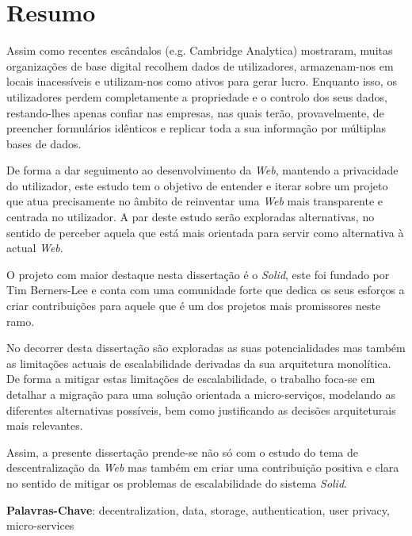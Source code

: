 \chapter*{Resumo}
Assim como recentes escândalos (e.g. Cambridge Analytica) mostraram, muitas organizações de base digital recolhem dados de utilizadores, armazenam-nos em locais inacessíveis e utilizam-nos como ativos para gerar lucro. Enquanto isso, os utilizadores perdem completamente a propriedade e o controlo dos seus dados, restando-lhes apenas confiar nas  empresas, nas quais terão, provavelmente, de preencher formulários idênticos e replicar toda a sua informação por múltiplas bases de dados.

De forma a dar seguimento ao desenvolvimento da \emph{Web}, mantendo a privacidade do utilizador, este estudo tem o objetivo de entender e iterar sobre um projeto que atua precisamente no âmbito de reinventar uma \emph{Web} mais transparente e centrada no utilizador. A par deste estudo serão exploradas alternativas, no sentido de perceber aquela que está mais orientada para servir como alternativa à actual \emph{Web}.

O projeto com maior destaque nesta dissertação é o \emph{Solid}, este foi fundado por Tim Berners-Lee e conta com uma comunidade forte que dedica os seus esforços a criar contribuições para aquele que é um dos projetos mais promissores neste ramo. 

No decorrer desta dissertação são exploradas as suas potencialidades mas também as limitações actuais de escalabilidade derivadas da sua arquitetura monolítica. De forma a mitigar estas limitações de escalabilidade, o trabalho foca-se em detalhar a migração para uma solução orientada a micro-serviços, modelando as diferentes alternativas possíveis, bem como justificando as decisões arquiteturais mais relevantes.

Assim, a presente dissertação prende-se não só com o estudo do tema de descentralização da \emph{Web} mas também em criar uma contribuição positiva e clara no sentido de mitigar os problemas de escalabilidade do sistema \emph{Solid}.

\textbf{Palavras-Chave}: decentralization, data, storage, authentication, user privacy, micro-services
